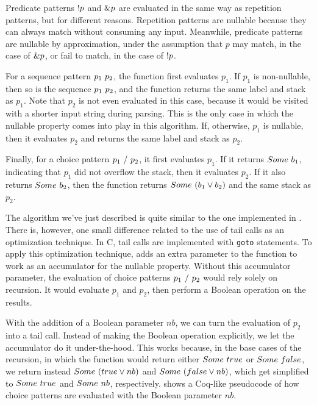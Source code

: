 Predicate patterns $!p$ and $\&p$ are evaluated
in the same way as repetition patterns,
but for different reasons.
Repetition patterns are nullable
because they can always match without consuming any input.
Meanwhile, predicate patterns are nullable by approximation,
under the assumption that $p$ may match,
in the case of $\&p$,
or fail to match,
in the case of $!p$.

For a sequence pattern $p_1\ p_2$,
the function first evaluates $p_1$.
If $p_1$ is non-nullable,
then so is the sequence $p_1\ p_2$,
and the function returns the same label and stack as $p_1$.
Note that $p_2$ is not even evaluated in this case,
because it would be visited with a shorter input string
during parsing.
This is the only case in which
the nullable property comes into play
in this algorithm.
If, otherwise, $p_1$ is nullable,
then it evaluates $p_2$
and returns the same label and stack as $p_2$.

Finally, for a choice pattern $p_1\ /\ p_2$,
it first evaluates $p_1$.
If it returns $Some\ b_1$,
indicating that $p_1$ did not overflow the stack,
then it evaluates $p_2$.
If it also returns $Some\ b_2$,
then the function returns $Some\ (b_1 \vee b_2)$
and the same stack as $p_2$.

The algorithm we've just described
is quite similar to the one implemented in \lpeg{}.
There is, however, one small difference
related to the use of tail calls
as an optimization technique.
In C, tail calls are implemented
with \texttt{goto} statements.
To apply this optimization technique,
\lpeg{} adds an extra parameter to the function
to work as an accumulator for the nullable property.
Without this accumulator parameter,
the evaluation of choice patterns $p_1\ /\ p_2$
would rely solely on recursion.
It would evaluate $p_1$ and $p_2$,
then perform a Boolean \scor{} operation on the results.

With the addition of a Boolean parameter $nb$,
we can turn the evaluation of $p_2$ into a tail call.
Instead of making the Boolean \scor{} operation explicitly,
we let the accumulator do it under-the-hood.
This works because,
in the base cases of the recursion,
in which the function would return
either $Some\ true$ or $Some\ false$,
we return instead $Some\ (true \vee nb)$ and $Some\ (false \vee nb)$,
which get simplified to $Some\ true$ and $Some\ nb$, respectively.
 shows a Coq-like pseudocode of how choice patterns
are evaluated with the Boolean parameter $nb$.

